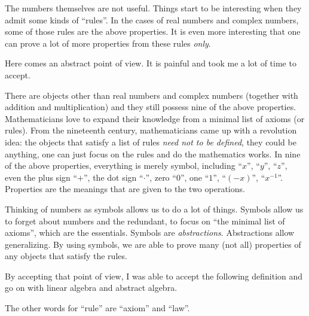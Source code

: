\begin{note}
    The numbers themselves are not useful. Things start to be interesting when they admit some kinds of ``rules''. In the cases of real numbers and complex numbers, some of those rules are the above properties. It is even more interesting that one can prove a lot of more properties from these rules \textit{only}.

    Here comes an abstract point of view. It is painful and took me a lot of time to accept.

    There are objects other than real numbers and complex numbers (together with addition and multiplication) and they still possess nine of the above properties. Mathematicians love to expand their knowledge from a minimal list of axioms (or rules). From the nineteenth century, mathematicians came up with a revolution idea: the objects that satisfy a list of rules \textit{need not to be defined}, they could be anything, one can just focus on the rules and do the mathematics works. In nine of the above properties, everything is merely symbol, including ``$x$'', ``$y$'', ``$z$'', even the plus sign ``$+$'', the dot sign ``$\cdot$'', zero ``$0$'', one ``$1$'', ``$(-x)$'', ``$x^{-1}$''. Properties are the meanings that are given to the two operations.

    Thinking of numbers as symbols allows us to do a lot of things. Symbols allow us to forget about numbers and the redundant, to focus on ``the minimal list of axioms'', which are the essentials. Symbols are \textit{abstractions}. Abstractions allow generalizing. By using symbols, we are able to prove many (not all) properties of any objects that satisfy the rules.

    By accepting that point of view, I was able to accept the following definition and go on with linear algebra and abstract algebra.

    The other words for ``rule'' are ``axiom'' and ``law''.
\end{note}

